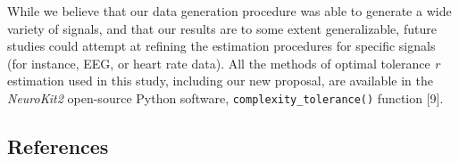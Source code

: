 \documentclass[
  man,floatsintext]{apa6}
\begin{document}
While we believe that our data generation procedure was able to generate a wide variety of signals, and that our results are to some extent generalizable, future studies could attempt at refining the estimation procedures for specific signals (for instance, EEG, or heart rate data). All the methods of optimal tolerance \emph{r} estimation used in this study, including our new proposal, are available in the \emph{NeuroKit2} open-source Python software, \texttt{complexity\_tolerance()} function {[}9{]}.

\newpage

\hypertarget{references}{%
\subsection{References}\label{references}}
\end{document}
